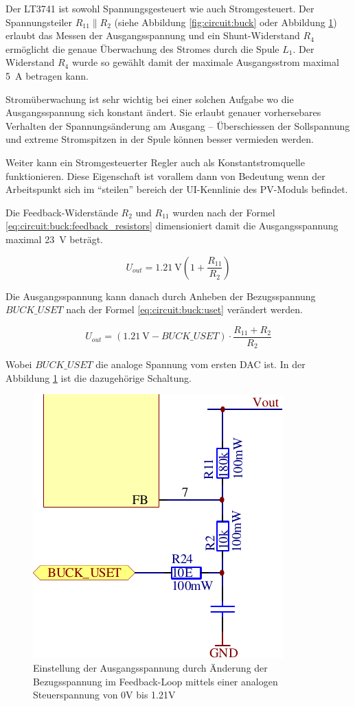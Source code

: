 Der  LT3741  ist  sowohl   Spannungsgesteuert   wie   auch  Stromgesteuert.  Der
Spannungsteiler  $R_{11} \parallel R_2$ (siehe Abbildung  \ref{fig:circuit:buck}
oder    Abbildung    \ref{fig:circuit:buck:uset})   erlaubt   das   Messen   der
Ausgangsspannung  und  ein  Shunt-Widerstand  $R_4$   erm\"oglicht   die  genaue
\"Uberwachung des Stromes durch die Spule  $L_1$.  Der Widerstand $R_4$ wurde so
gew\"ahlt damit der  maximale  Ausgangsstrom  maximal  \SI{5}{\ampere}  betragen
kann.

Strom\"uberwachung   ist  sehr  wichtig  bei  einer  solchen  Aufgabe   wo   die
Ausgangsspannung  sich  konstant  \"andert.  Sie erlaubt  genauer  vorhersebares
Verhalten der Spannungs\"anderung am Ausgang -- \"Uberschiessen der Sollspannung
und  extreme  Stromspitzen  in  der  Spule  k\"onnen  besser  vermieden  werden.

Weiter   kann   ein   Stromgesteuerter   Regler  auch  als   Konstantstromquelle
funktionieren. Diese Eigenschaft  ist  vorallem  dann  von  Bedeutung  wenn  der
Arbeitspunkt  sich  im  ``steilen''  bereich  der   UI-Kennlinie  des  PV-Moduls
befindet.

Die  Feedback-Widerst\"ande   $R_2$   und   $R_{11}$   wurden  nach  der  Formel
\ref{eq:circuit:buck:feedback_resistors}       dimensioniert      damit      die
Ausgangsspannung maximal \SI{23}{\volt} betr\"agt.

\begin{equation}
    U_{out} = \SI{1.21}{\volt} \left( 1 + \frac{R_{11}}{R_2} \right)
    \label{eq:circuit:buck:feedback_resistors}
\end{equation}

Die Ausgangsspannung kann  danach  durch Anheben der Bezugsspannung $BUCK\_USET$
nach der  Formel \ref{eq:circuit:buck:uset} ver\"andert werden. 

\begin{equation}
    U_{out} = (\SI{1.21}{\volt} - BUCK\_USET) \cdot \frac{R_{11} + R_2}{R_2}
    \label{eq:circuit:buck:uset}
\end{equation}

Wobei $BUCK\_USET$ die analoge Spannung vom  ersten  DAC  ist.  In der Abbildung
\ref{fig:circuit:buck:uset} ist die dazugeh\"orige Schaltung.

\begin{figure}[th!]
    \center
    \includegraphics[width=.35\textwidth]{images/circuit/buck-uset.pdf}
    \caption{Einstellung der Ausgangsspannung durch \"Anderung der Bezugsspannung im Feedback-Loop mittels einer analogen Steuerspannung von 0V bis 1.21V}
    \label{fig:circuit:buck:uset}
\end{figure}

